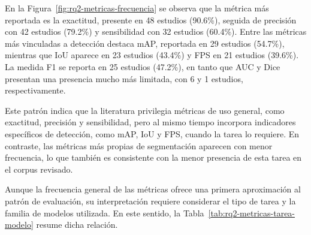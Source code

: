 \vspace{-1.0 cm}

En la Figura~\ref{fig:rq2-metricas-frecuencia} se observa que la métrica más reportada es la exactitud, presente en 48 estudios (90.6\%), seguida de precisión con 42 estudios (79.2\%) y sensibilidad con 32 estudios (60.4\%). Entre las métricas más vinculadas a detección destaca mAP, reportada en 29 estudios (54.7\%), mientras que IoU aparece en 23 estudios (43.4\%) y FPS en 21 estudios (39.6\%). La medida F1 se reporta en 25 estudios (47.2\%), en tanto que AUC y Dice presentan una presencia mucho más limitada, con 6 y 1 estudios, respectivamente.

Este patrón indica que la literatura privilegia métricas de uso general, como exactitud, precisión y sensibilidad, pero al mismo tiempo incorpora indicadores específicos de detección, como mAP, IoU y FPS, cuando la tarea lo requiere. En contraste, las métricas más propias de segmentación aparecen con menor frecuencia, lo que también es consistente con la menor presencia de esta tarea en el corpus revisado.

Aunque la frecuencia general de las métricas ofrece una primera aproximación al patrón de evaluación, su interpretación requiere considerar el tipo de tarea y la familia de modelos utilizada. En este sentido, la Tabla~\ref{tab:rq2-metricas-tarea-modelo} resume dicha relación. \\

